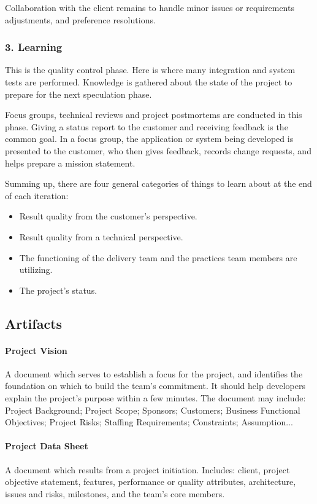 \documentclass[main.tex]{subfiles}
\begin{document}
Collaboration with the client remains to handle minor issues or requirements adjustments, and preference resolutions.

\subsubsection[Learning]{3. Learning}

This is the quality control phase. Here is where many integration and system tests are performed. Knowledge is gathered about the state of the project to prepare for the next speculation phase.

Focus groups, technical reviews and project postmortems are conducted in this phase. Giving a status report to the customer and receiving feedback is the common goal. In a focus group, the application or system being developed is presented to the customer, who then gives feedback, records change requests, and helps prepare a mission statement.

Summing up, there are four general categories of things to learn about at the end of each iteration:

\begin{itemize}
	\item Result quality from the customer's perspective.
	\item Result quality from a technical perspective.
	\item The functioning of the delivery team and the practices team members are utilizing.
	\item The project's status.
\end{itemize}

\subsection{Artifacts}

\paragraph{Project Vision}
A document which serves to establish a focus for the project, and identifies the foundation on which to build the team's commitment.
It should help developers explain the project's purpose within a few minutes. The document may include: Project Background; Project Scope; Sponsors; Customers; Business Functional Objectives; Project Risks; Staffing Requirements; Constraints; Assumption...

\paragraph{Project Data Sheet}
A document which results from a project initiation. Includes: client, project objective statement, features, performance or quality attributes, architecture, issues and risks, milestones, and the team's core members.
\end{document}
